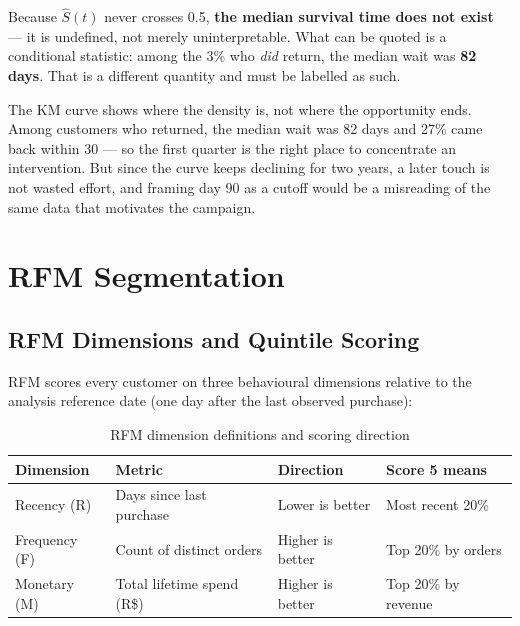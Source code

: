 Because $\hat{S}(t)$ never crosses 0.5, \textbf{the median survival time does not
exist} --- it is undefined, not merely uninterpretable. What can be quoted is a
conditional statistic: among the 3\% who \emph{did} return, the median wait was
\textbf{82 days}. That is a different quantity and must be labelled as such.

\begin{keyinsight}
The KM curve shows where the density is, not where the opportunity ends. Among
customers who returned, the median wait was 82 days and 27\% came back within
30 --- so the first quarter is the right place to concentrate an intervention.
But since the curve keeps declining for two years, a later touch is not wasted
effort, and framing day 90 as a cutoff would be a misreading of the same data
that motivates the campaign.
\end{keyinsight}

\section{RFM Segmentation}
\label{sec:ecom-rfm}


\subsection{RFM Dimensions and Quintile Scoring}

RFM scores every customer on three behavioural dimensions relative to the
analysis reference date (one day after the last observed purchase):

\begin{table}[h]
\centering
\caption{RFM dimension definitions and scoring direction}
\label{tab:rfm-dims}
\begin{tabular}{llll}
\toprule
\textbf{Dimension} & \textbf{Metric} & \textbf{Direction} & \textbf{Score 5 means} \\
\midrule
Recency (R)   & Days since last purchase  & Lower is better  & Most recent 20\%  \\
Frequency (F) & Count of distinct orders  & Higher is better & Top 20\% by orders \\
Monetary (M)  & Total lifetime spend (R\$) & Higher is better & Top 20\% by revenue \\
\bottomrule
\end{tabular}
\end{table}

